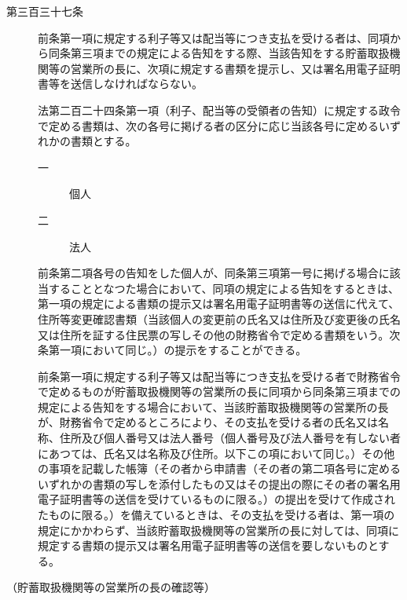 \documentclass[twocolumn,a4j,10pt]{ltjtarticle}
\begin{document}
\begin{description}
\item[第三百三十七条]前条第一項に規定する利子等又は配当等につき支払を受ける者は、同項から同条第三項までの規定による告知をする際、当該告知をする貯蓄取扱機関等の営業所の長に、次項に規定する書類を提示し、又は署名用電子証明書等を送信しなければならない。
\item[]法第二百二十四条第一項（利子、配当等の受領者の告知）に規定する政令で定める書類は、次の各号に掲げる者の区分に応じ当該各号に定めるいずれかの書類とする。
\begin{description}
\item[一]個人
\item[二]法人
\end{description}
\item[]前条第二項各号の告知をした個人が、同条第三項第一号に掲げる場合に該当することとなつた場合において、同項の規定による告知をするときは、第一項の規定による書類の提示又は署名用電子証明書等の送信に代えて、住所等変更確認書類（当該個人の変更前の氏名又は住所及び変更後の氏名又は住所を証する住民票の写しその他の財務省令で定める書類をいう。次条第一項において同じ。）の提示をすることができる。
\item[]前条第一項に規定する利子等又は配当等につき支払を受ける者で財務省令で定めるものが貯蓄取扱機関等の営業所の長に同項から同条第三項までの規定による告知をする場合において、当該貯蓄取扱機関等の営業所の長が、財務省令で定めるところにより、その支払を受ける者の氏名又は名称、住所及び個人番号又は法人番号（個人番号及び法人番号を有しない者にあつては、氏名又は名称及び住所。以下この項において同じ。）その他の事項を記載した帳簿（その者から申請書（その者の第二項各号に定めるいずれかの書類の写しを添付したもの又はその提出の際にその者の署名用電子証明書等の送信を受けているものに限る。）の提出を受けて作成されたものに限る。）を備えているときは、その支払を受ける者は、第一項の規定にかかわらず、当該貯蓄取扱機関等の営業所の長に対しては、同項に規定する書類の提示又は署名用電子証明書等の送信を要しないものとする。
\end{description}
\noindent\hspace{10pt}（貯蓄取扱機関等の営業所の長の確認等）
\end{document}
